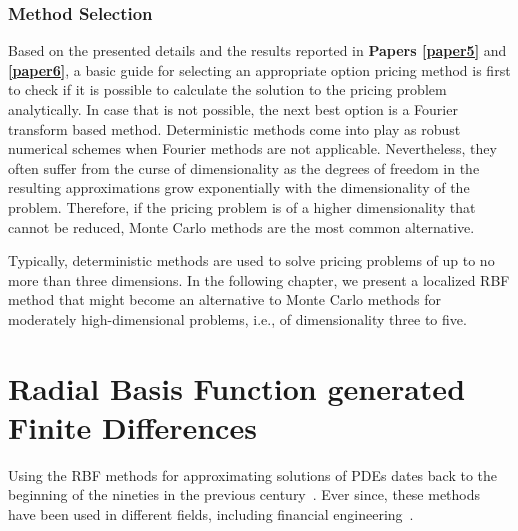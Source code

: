 \documentclass{UUThesisTemplate}
\begin{document}
%
\subsection{Method Selection}

\par
Based on the presented details and the results reported in \textbf{Papers \ref{paper5}} and \textbf{\ref{paper6}}, a basic guide for selecting an appropriate option pricing method is first to check if it is possible to calculate the solution to the pricing problem analytically. In case that is not possible, the next best option is a Fourier transform based method. Deterministic methods come into play as robust numerical schemes when Fourier methods are not applicable. Nevertheless, they often suffer from the curse of dimensionality as the degrees of freedom in the resulting approximations grow exponentially with the dimensionality of the problem. Therefore, if the pricing problem is of a higher dimensionality that cannot be reduced, Monte Carlo methods are the most common alternative.

\par
Typically, deterministic methods are used to solve pricing problems of up to no more than three dimensions. In the following chapter, we present a localized RBF method that might become an alternative to Monte Carlo methods for moderately high-dimensional problems, i.e., of dimensionality three to five. 
%
%





%
\chapter{Radial Basis Function generated Finite Differences}
\label{ch:rbffd}

\par
Using the RBF methods for approximating solutions of PDEs dates back to the beginning of the nineties in the previous century~\cite{kansa1990multiquadrics1,kansa1990multiquadrics2}. Ever since, these methods have been used in different fields, including financial engineering~\cite{hon1999radial, fasshauer2004using,pettersson2008improved}. 
\end{document}
